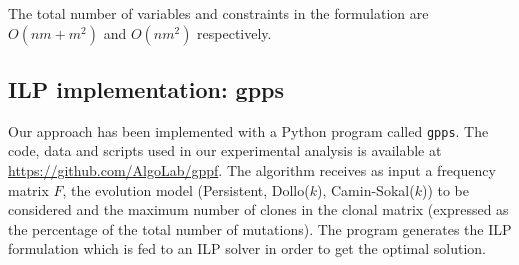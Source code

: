 \documentclass[a4paper,USenglish]{article}
\theoremstyle{definition}
\begin{document}





The total number of variables and constraints in the formulation are
$O(nm+m^2)$ and $O(nm^2)$ respectively.

\subsection{ILP implementation: gpps}

Our approach has been implemented with a Python program called
\texttt{gpps}.  The code, data and scripts used in our experimental
analysis is available at \url{https://github.com/AlgoLab/gppf}.  The
algorithm receives as input a frequency matrix $F$, the evolution
model (Persistent, Dollo($k$), Camin-Sokal($k$)) to be considered and
the maximum number of clones in the clonal matrix (expressed as the
percentage of the total number of mutations).  The program generates
the ILP formulation which is fed to an ILP solver in order to get the
optimal solution.
\end{document}
